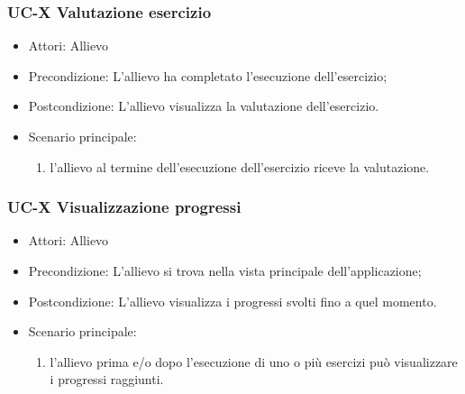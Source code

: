 	\subsubsection{UC-X Valutazione esercizio}
	\begin{itemize}
			\item Attori: Allievo
			\item Precondizione: L'allievo ha completato l'esecuzione dell'esercizio;
			\item Postcondizione: L'allievo visualizza la valutazione dell'esercizio.
			\item Scenario principale:
				\begin{enumerate}
					\item l'allievo al termine dell'esecuzione dell'esercizio riceve la valutazione.
				\end{enumerate}
			\end{itemize}
			
	\subsubsection{UC-X Visualizzazione progressi}
	\begin{itemize}
			\item Attori: Allievo
			\item Precondizione: L'allievo si trova nella vista principale dell'applicazione;
			\item Postcondizione: L'allievo visualizza i progressi svolti fino a quel momento.
			\item Scenario principale:
				\begin{enumerate}
					\item l'allievo prima e/o dopo l'esecuzione di uno o più esercizi può visualizzare i progressi raggiunti.
				\end{enumerate}
			\end{itemize}
